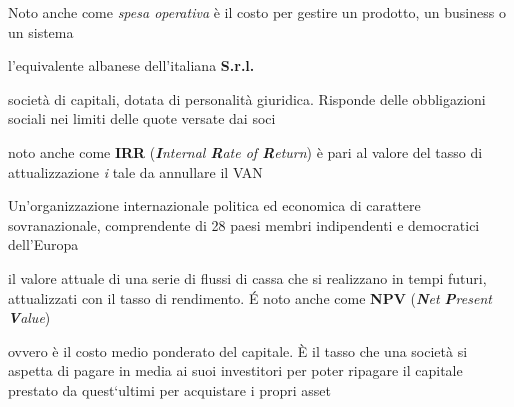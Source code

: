 \begin{acronym}
\begin{multicols}{2}
		   {\newline \small Noto anche come \textit{spesa operativa} è il costo per gestire un prodotto, un business o un sistema \par}

		   {\newline \small l'equivalente albanese dell'italiana \textbf{\ac{S.r.l.}}\par}

		   {\newline \small società di capitali, dotata di personalità giuridica. Risponde delle obbligazioni sociali nei limiti delle quote versate dai soci\par}

		   {\newline \small noto anche come \textbf{IRR} (\textit{\textbf{I}nternal \textbf{R}ate of \textbf{R}eturn}) è pari al valore del tasso di attualizzazione \textit{i} tale da annullare il \ac{VAN} \par}		   

		   {\newline \small Un'organizzazione internazionale politica ed economica di carattere sovranazionale, comprendente di 28 paesi membri indipendenti e democratici dell'Europa\cite{paesiUE} \par}
		   
		   {\newline \small il valore attuale di una serie di flussi di cassa che si realizzano in tempi futuri, attualizzati con il tasso di rendimento. \'E noto anche come \textbf{NPV} (\textit{\textbf{N}et \textbf{P}resent \textbf{V}alue}) \par}		   

		   {\newline \small ovvero è il costo medio ponderato del capitale. \`E il tasso che una società si aspetta di pagare in media ai suoi investitori per poter ripagare il capitale prestato da quest`ultimi per acquistare i propri asset \par}		
		   
\end{multicols}
\end{acronym}